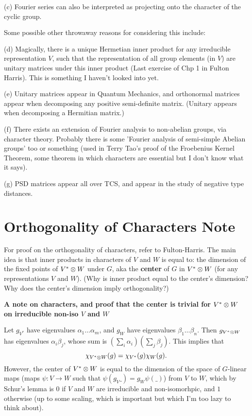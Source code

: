 (c) Fourier series can also be interpreted as projecting onto the
character of the cyclic group.

\vspace{3 mm}
Some possible other throwaway reasons for considering this
include: 

(d) Magically, there is a unique Hermetian inner product for any
irreducible representation $V$, such that the representation of all
group elements (in $V$) are unitary matrices under this inner product (Last exercise of Chp 1 in Fulton
Harris). This is something I haven't looked into yet.

(e) Unitary matrices appear in Quantum Mechanics, and orthonormal
matrices appear when decomposing any positive semi-definite
matrix. (Unitary appears when decomposing a Hermitian matrix.)

(f) There exists an extension of Fourier analysis to non-abelian
groups, via character theory. Probably there is some 'Fourier analysis of semi-simple
Abelian groups' too or something (used in Terry Tao's proof of
the Froebenius Kernel Theorem, some theorem in which characters
are essential but I don't know what it says).

(g) PSD matrices appear all over TCS, and appear in the study of
negative type distances.

\section{Orthogonality of Characters Note}\label{sec:summary}
For proof on the orthogonality of characters, refer to
Fulton-Harris. The main idea is that inner products in characters
of $V$ and $W$
is equal to: the dimension of the fixed points of $V^{*} \otimes W$
under $G$, aka the \textbf{center} of $G$ in $V^{*} \otimes W$
(for any representations $V$ and $W$). (Why is inner product
equal to the center's dimension? Why does the center's dimension
imply orthogonality?)

\textbf{A note on characters, and proof that the center is
trivial for $V^{*} \otimes W$ on irreducible non-iso $V$ and $W$}

Let $g_{V^{*}}$ have eigenvalues $\alpha_1 \ldots \alpha_m$, and
$g_{W}$ have eigenvalues $\beta_1 \ldots \beta_n$. Then $g_{V^{*}
\otimes W}$ has eigenvalues $\alpha_i \beta_j$, whose sum is
$(\sum_{i} \alpha_i)(\sum_j \beta_j)$. This implies that
\[ \chi_{V^{*} \otimes W}(g) = \chi_{V^{*}}(g) \chi_{W}(g). \]
However, the center of $V^{*} \otimes W$ is equal to the
dimension of the space of $G$-linear maps (maps
$\psi: V \rightarrow W$ such that $\psi(g_V \_) = g_W \psi(\_)$) from $V$ to $W$, which by Schur's
lemma is $0$ if $V$ and $W$ are irreducible and non-isomorhpic,
and $1$ otherwise (up to some scaling, which is important but
which I'm too lazy to think about).

